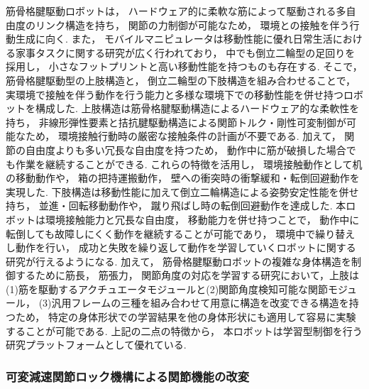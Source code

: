 \documentclass[twocolumn]{d-abst}
\begin{document}
筋骨格腱駆動ロボットは， ハードウェア的に柔軟な筋によって駆動される多自由度のリンク構造を持ち， 関節の力制御が可能なため， 環境との接触を伴う行動生成に向く. また， モバイルマニピュレータは移動性能に優れ日常生活における家事タスクに関する研究が広く行われており， 中でも倒立二輪型の足回りを採用し， 小さなフットプリントと高い移動性能を持つものも存在する. そこで， 筋骨格腱駆動型の上肢構造と， 倒立二輪型の下肢構造を組み合わせることで， 実環境で接触を伴う動作を行う能力と多様な環境下での移動性能を併せ持つロボットを構成した. 上肢構造は筋骨格腱駆動構造によるハードウェア的な柔軟性を持ち， 非線形弾性要素と拮抗腱駆動構造による関節トルク・剛性可変制御が可能なため， 環境接触行動時の厳密な接触条件の計画が不要である. 加えて， 関節の自由度よりも多い冗長な自由度を持つため， 動作中に筋が破損した場合でも作業を継続することができる. これらの特徴を活用し， 環境接触動作として机の移動動作や， 箱の把持運搬動作， 壁への衝突時の衝撃緩和・転倒回避動作を実現した. 下肢構造は移動性能に加えて倒立二輪構造による姿勢安定性能を併せ持ち， 並進・回転移動動作や， 蹴り飛ばし時の転倒回避動作を達成した. 本ロボットは環境接触能力と冗長な自由度， 移動能力を併せ持つことで， 動作中に転倒しても故障しにくく動作を継続することが可能であり， 環境中で繰り替えし動作を行い， 成功と失敗を繰り返して動作を学習していくロボットに関する研究が行えるようになる. 加えて， 筋骨格腱駆動ロボットの複雑な身体構造を制御するために筋長， 筋張力， 関節角度の対応を学習する研究において，上肢は(1)筋を駆動するアクチュエータモジュールと(2)関節角度検知可能な関節モジュール， (3)汎用フレームの三種を組み合わせて用意に構造を改変できる構造を持つため， 特定の身体形状での学習結果を他の身体形状にも適用して容易に実験することが可能である. 上記の二点の特徴から， 本ロボットは学習型制御を行う研究プラットフォームとして優れている.

\subsubsection{可変減速関節ロック機構による関節機能の改変}
\end{document}
